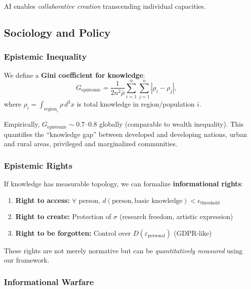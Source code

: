 \documentclass[12pt]{article}
\begin{document}
AI enables \emph{collaborative creation} transcending individual capacities.

\subsection{Sociology and Policy}

\subsubsection{Epistemic Inequality}

We define a \textbf{Gini coefficient for knowledge}:
\begin{equation}
    G_{\text{epistemic}} = \frac{1}{2n^2\bar{\rho}} \sum_{i=1}^n \sum_{j=1}^n |\rho_i - \rho_j|,
\end{equation}
where $\rho_i = \int_{\text{region}_i} \rho\, d^3x$ is total knowledge in region/population $i$.

Empirically, $G_{\text{epistemic}} \sim 0.7$--$0.8$ globally (comparable to wealth inequality). This quantifies the ``knowledge gap'' between developed and developing nations, urban and rural areas, privileged and marginalized communities.

\subsubsection{Epistemic Rights}

If knowledge has measurable topology, we can formalize \textbf{informational rights}:

\begin{enumerate}
    \item \textbf{Right to access:} $\forall$ person, $d(\text{person}, \text{basic knowledge}) < \epsilon_{\text{threshold}}$
    \item \textbf{Right to create:} Protection of $\sigma$ (research freedom, artistic expression)
    \item \textbf{Right to be forgotten:} Control over $D(\varepsilon_{\text{personal}})$ (GDPR-like)
\end{enumerate}

These rights are not merely normative but can be \emph{quantitatively measured} using our framework.

\subsubsection{Informational Warfare}
\end{document}
